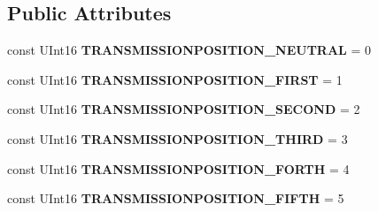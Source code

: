 \subsection*{Public Attributes}
\begin{DoxyCompactItemize}
\item 
\hypertarget{interfaceVehicle_1_1org_1_1automotive_1_1Transmission_afdaacbc9ace90504b93d8392988e8b22}{const U\-Int16 {\bfseries T\-R\-A\-N\-S\-M\-I\-S\-S\-I\-O\-N\-P\-O\-S\-I\-T\-I\-O\-N\-\_\-\-N\-E\-U\-T\-R\-A\-L} = 0}\label{interfaceVehicle_1_1org_1_1automotive_1_1Transmission_afdaacbc9ace90504b93d8392988e8b22}

\item 
\hypertarget{interfaceVehicle_1_1org_1_1automotive_1_1Transmission_a960b322a13fffd5bcc61e57205efb641}{const U\-Int16 {\bfseries T\-R\-A\-N\-S\-M\-I\-S\-S\-I\-O\-N\-P\-O\-S\-I\-T\-I\-O\-N\-\_\-\-F\-I\-R\-S\-T} = 1}\label{interfaceVehicle_1_1org_1_1automotive_1_1Transmission_a960b322a13fffd5bcc61e57205efb641}

\item 
\hypertarget{interfaceVehicle_1_1org_1_1automotive_1_1Transmission_aff00c5101c3c0a93c2ca2fecf164a026}{const U\-Int16 {\bfseries T\-R\-A\-N\-S\-M\-I\-S\-S\-I\-O\-N\-P\-O\-S\-I\-T\-I\-O\-N\-\_\-\-S\-E\-C\-O\-N\-D} = 2}\label{interfaceVehicle_1_1org_1_1automotive_1_1Transmission_aff00c5101c3c0a93c2ca2fecf164a026}

\item 
\hypertarget{interfaceVehicle_1_1org_1_1automotive_1_1Transmission_a9fd8681efec2e22f3a3febdad15f6510}{const U\-Int16 {\bfseries T\-R\-A\-N\-S\-M\-I\-S\-S\-I\-O\-N\-P\-O\-S\-I\-T\-I\-O\-N\-\_\-\-T\-H\-I\-R\-D} = 3}\label{interfaceVehicle_1_1org_1_1automotive_1_1Transmission_a9fd8681efec2e22f3a3febdad15f6510}

\item 
\hypertarget{interfaceVehicle_1_1org_1_1automotive_1_1Transmission_a71ac807767b7cf5d8f3cc7fc676ec89f}{const U\-Int16 {\bfseries T\-R\-A\-N\-S\-M\-I\-S\-S\-I\-O\-N\-P\-O\-S\-I\-T\-I\-O\-N\-\_\-\-F\-O\-R\-T\-H} = 4}\label{interfaceVehicle_1_1org_1_1automotive_1_1Transmission_a71ac807767b7cf5d8f3cc7fc676ec89f}

\item 
\hypertarget{interfaceVehicle_1_1org_1_1automotive_1_1Transmission_a0e27aedb535f9a277673d75a1780bb84}{const U\-Int16 {\bfseries T\-R\-A\-N\-S\-M\-I\-S\-S\-I\-O\-N\-P\-O\-S\-I\-T\-I\-O\-N\-\_\-\-F\-I\-F\-T\-H} = 5}\label{interfaceVehicle_1_1org_1_1automotive_1_1Transmission_a0e27aedb535f9a277673d75a1780bb84}


\end{DoxyCompactItemize}
